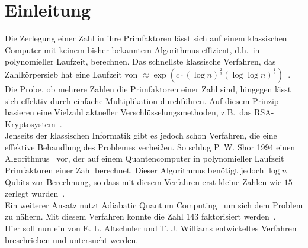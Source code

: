 \chapter{Einleitung}
Die Zerlegung einer Zahl in ihre Primfaktoren lässt sich auf einem klassischen Computer mit keinem bisher bekanntem Algorithmus effizient, d.h.\ in polynomieller Laufzeit, berechnen. Das schnellste klassische Verfahren, das Zahlkörpersieb hat eine Laufzeit von $\approx\exp\left(c\cdot{\left(\log n\right)}^\frac{2}{3}{\left(\log\log n\right)}^\frac{1}{3}\right)$~\parencite{pomerance}.\\
Die Probe, ob mehrere Zahlen die Primfaktoren einer Zahl sind, hingegen lässt sich effektiv durch einfache Multiplikation durchführen. Auf diesem Prinzip basieren eine Vielzahl aktueller Verschlüsselungsmethoden, z.B.\ das RSA-Kryptosystem~\parencite{rsa}. \\
Jenseits der klassischen Informatik gibt es jedoch schon Verfahren, die eine effektive Behandlung des Problemes verheißen. So schlug P. W. Shor 1994 einen Algorithmus~\parencite{shor} vor, der auf einem Quantencomputer in polynomieller Laufzeit Primfaktoren einer Zahl berechnet. Dieser Algorithmus benötigt jedoch $\log n$ Qubits zur Berechnung, so dass mit diesem Verfahren erst kleine Zahlen wie $15$ zerlegt wurden~\parencite{vandersypen}.\\
Ein weiterer Ansatz nutzt Adiabatic Quantum Computing~\parencite{suter} um sich dem Problem zu nähern. Mit diesem Verfahren konnte die Zahl $143$ faktorisiert werden~\parencite{xu}. \\
Hier soll nun ein von E. L. Altschuler und T. J. Williams entwickeltes Verfahren~\parencite{altschuler} breschrieben und untersucht werden.

